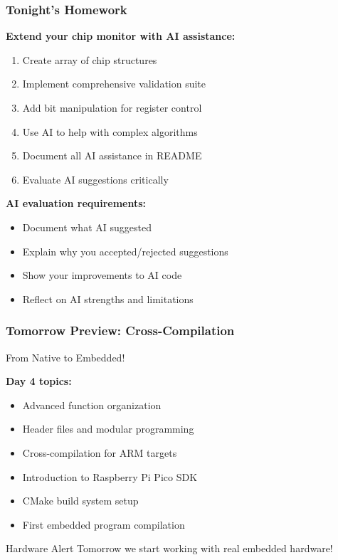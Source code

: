 \documentclass{beamer}
\begin{document}
\begin{frame}
\frametitle{Tonight's Homework}
\textbf{Extend your chip monitor with AI assistance:}
\begin{enumerate}
    \item Create array of chip structures
    \item Implement comprehensive validation suite
    \item Add bit manipulation for register control
    \item Use AI to help with complex algorithms
    \item Document all AI assistance in README
    \item Evaluate AI suggestions critically
\end{enumerate}

\vspace{0.5cm}
\textbf{AI evaluation requirements:}
\begin{itemize}
    \item Document what AI suggested
    \item Explain why you accepted/rejected suggestions
    \item Show your improvements to AI code
    \item Reflect on AI strengths and limitations
\end{itemize}
\end{frame}

\begin{frame}
\frametitle{Tomorrow Preview: Cross-Compilation}
\begin{center}
\Large From Native to Embedded!
\end{center}

\textbf{Day 4 topics:}
\begin{itemize}
    \item Advanced function organization
    \item Header files and modular programming
    \item Cross-compilation for ARM targets
    \item Introduction to Raspberry Pi Pico SDK
    \item CMake build system setup
    \item First embedded program compilation
\end{itemize}

\vspace{0.5cm}
\begin{alertblock}{Hardware Alert}
Tomorrow we start working with real embedded hardware!
\end{alertblock}
\end{frame}
\end{document}
